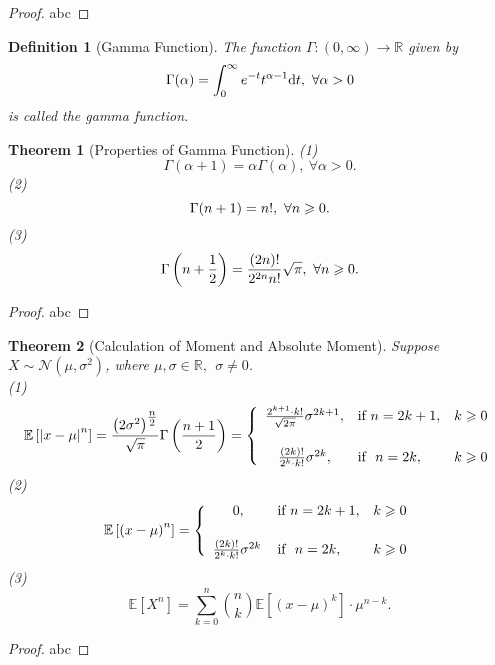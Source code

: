 \documentclass[openany,12pt]{book}
\newtheorem{theorem}{Theorem}[chapter]
\newtheorem{definition}{Definition}[chapter]
\begin{document}
\begin{proof}
  abc
\end{proof}

\begin{definition}[Gamma Function]
The function $\Gamma:(0,\infty)\to\mathbb{R}$ given by
$$
{\Gamma}(\alpha)=\int_{0}^{\infty}e^{-t}t^{\alpha-1}\mathrm{d} t,\ \forall\alpha>0
$$
is called the gamma function.
\end{definition}

\begin{theorem}[Properties of Gamma Function]
(1)
$$
{\Gamma}(\alpha+1)=\alpha\Gamma(\alpha),\ \forall\alpha>0.
$$
(2)
$$
{\Gamma}(n+1)=n!,\ \forall n\geqslant0.
$$
(3)
$$
{\Gamma}\left(n+\frac{1}{2}\right)=\frac{\left(2n\right)!}{2^{2n}n!}\sqrt\pi,\ \forall n\gs0.
$$
\end{theorem}

\begin{proof}
  abc
\end{proof}

\begin{theorem}[Calculation of Moment and Absolute Moment]
Suppose $X\sim \mathcal{N}(\mu,\sigma^2)$, where $\mu,\sigma\in\mathbb{R},\ \ \sigma\neq0$.\\
(1)
\[\mathbb{E}\left[ \left| x - \mu \right|^{n} \right] = \frac{\left( 2\sigma^{2} \right)^{\tfrac{n}{2}}}{\sqrt{\pi}}\Gamma\left( \frac{n + 1}{2} \right) = \left\{ \begin{array}{cll}
\frac{2^{k + 1} \cdot k!}{\sqrt{2\pi}}\sigma^{2k + 1},&\mathrm{\text{if}}\ n = 2k + 1,&k \gs 0 \vspace{0.5cm}\\
\frac{(2k)!}{2^{k} \cdot k!}\sigma^{2k},&\text{if}\ \ n = 2k,&k \gs 0 \\
\end{array} \right.\]
(2)
\[\mathbb{E}\left[ {(x - \mu)}^{n} \right] = \left\{ \begin{array}{cll}
0,&\mathrm{\text{if}}\ n = 2k + 1,&k \gs 0 \vspace{0.5cm}\\
\frac{(2k)!}{2^{k} \cdot k!}\sigma^{2k}\,&{\text{if}}\ \ n = 2k,&k \gs 0 \\
\end{array} \right.\]
(3)
\[\mathbb{E}[X^{n}] = \sum_{k = 0}^{n}\binom n k \mathbb{E}\left[ \left( x - \mu \right)^{k} \right]\cdot \mu^{n - k}.\]
\end{theorem}

\begin{proof}
  abc
\end{proof}
\end{document}
